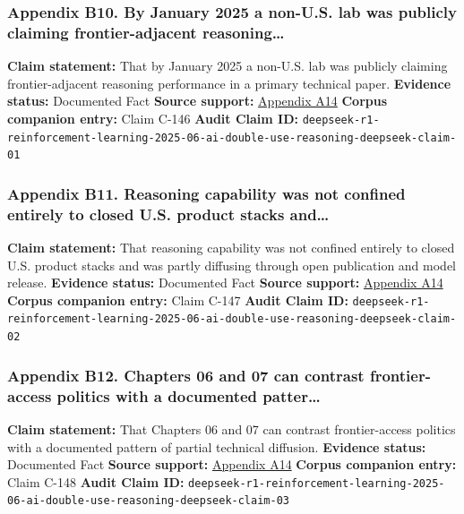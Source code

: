 \documentclass[
  american,
  11pt,
  letterpaper,
]{article}
\begin{document}
\subsubsection{Appendix B10. By January 2025 a non-U.S. lab was publicly
claiming frontier-adjacent
reasoning\ldots{}}\label{appendix-b10-by-january-2025-a-non-u-s-lab-was-publicly-claiming-frontier-adjacent-reasoning}

\textbf{Claim statement:} That by January 2025 a non-U.S. lab was
publicly claiming frontier-adjacent reasoning performance in a primary
technical paper. \textbf{Evidence status:} Documented Fact
\textbf{Source support:}
\hyperref[appendix-a14-deepseek-r1-incentivizing-reasoning-capability-in-llms-via-reinforcement-learning]{Appendix
A14} \textbf{Corpus companion entry:} Claim C-146 \textbf{Audit Claim
ID:}
\texttt{deepseek-r1-reinforcement-learning-2025-06-ai-double-use-reasoning-deepseek-claim-01}

\subsubsection{Appendix B11. Reasoning capability was not confined
entirely to closed U.S. product stacks
and\ldots{}}\label{appendix-b11-reasoning-capability-was-not-confined-entirely-to-closed-u-s-product-stacks-and}

\textbf{Claim statement:} That reasoning capability was not confined
entirely to closed U.S. product stacks and was partly diffusing through
open publication and model release. \textbf{Evidence status:} Documented
Fact \textbf{Source support:}
\hyperref[appendix-a14-deepseek-r1-incentivizing-reasoning-capability-in-llms-via-reinforcement-learning]{Appendix
A14} \textbf{Corpus companion entry:} Claim C-147 \textbf{Audit Claim
ID:}
\texttt{deepseek-r1-reinforcement-learning-2025-06-ai-double-use-reasoning-deepseek-claim-02}

\subsubsection{Appendix B12. Chapters 06 and 07 can contrast
frontier-access politics with a documented
patter\ldots{}}\label{appendix-b12-chapters-06-and-07-can-contrast-frontier-access-politics-with-a-documented-patter}

\textbf{Claim statement:} That Chapters 06 and 07 can contrast
frontier-access politics with a documented pattern of partial technical
diffusion. \textbf{Evidence status:} Documented Fact \textbf{Source
support:}
\hyperref[appendix-a14-deepseek-r1-incentivizing-reasoning-capability-in-llms-via-reinforcement-learning]{Appendix
A14} \textbf{Corpus companion entry:} Claim C-148 \textbf{Audit Claim
ID:}
\texttt{deepseek-r1-reinforcement-learning-2025-06-ai-double-use-reasoning-deepseek-claim-03}
\end{document}
